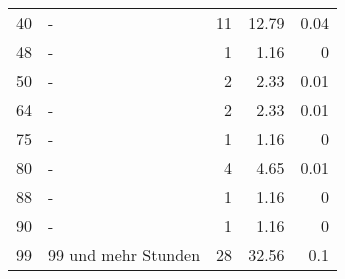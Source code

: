 \begin{longtable}{lXrrr}
        40 & \multicolumn{1}{X}{-} & %
          \num{11} &
          \num[round-mode=places,round-precision=2]{12.79} &
          \num[round-mode=places,round-precision=2]{0.04} \\

        48 & \multicolumn{1}{X}{-} & %
          \num{1} &
          \num[round-mode=places,round-precision=2]{1.16} &
          \num[round-mode=places,round-precision=2]{0} \\

        50 & \multicolumn{1}{X}{-} & %
          \num{2} &
          \num[round-mode=places,round-precision=2]{2.33} &
          \num[round-mode=places,round-precision=2]{0.01} \\

        64 & \multicolumn{1}{X}{-} & %
          \num{2} &
          \num[round-mode=places,round-precision=2]{2.33} &
          \num[round-mode=places,round-precision=2]{0.01} \\

        75 & \multicolumn{1}{X}{-} & %
          \num{1} &
          \num[round-mode=places,round-precision=2]{1.16} &
          \num[round-mode=places,round-precision=2]{0} \\

        80 & \multicolumn{1}{X}{-} & %
          \num{4} &
          \num[round-mode=places,round-precision=2]{4.65} &
          \num[round-mode=places,round-precision=2]{0.01} \\

        88 & \multicolumn{1}{X}{-} & %
          \num{1} &
          \num[round-mode=places,round-precision=2]{1.16} &
          \num[round-mode=places,round-precision=2]{0} \\

        90 & \multicolumn{1}{X}{-} & %
          \num{1} &
          \num[round-mode=places,round-precision=2]{1.16} &
          \num[round-mode=places,round-precision=2]{0} \\

        99 & \multicolumn{1}{X}{99 und mehr Stunden} & %
          \num{28} &
          \num[round-mode=places,round-precision=2]{32.56} &
          \num[round-mode=places,round-precision=2]{0.1} \\


\end{longtable}
